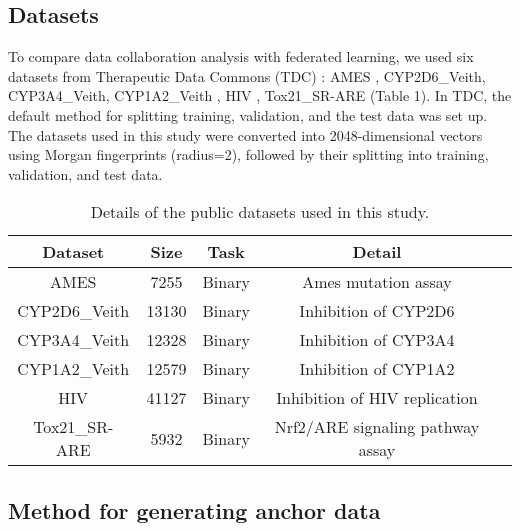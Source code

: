\documentclass{article}
\begin{document}
\subsection{Datasets}
\label{sec:sample1}
To compare data collaboration analysis with federated learning, we used six datasets from Therapeutic Data Commons (TDC) \cite{huang2021therapeutics}: AMES \cite{xu2012silico}, CYP2D6\_Veith, CYP3A4\_Veith, CYP1A2\_Veith \cite{veith2009comprehensive}, HIV \cite{wu2018moleculenet}, Tox21\_SR-ARE \cite{mayr2016deeptox} (Table 1). In TDC, the default method for splitting training, validation, and the test data was set up. The datasets used in this study were converted into 2048-dimensional vectors using Morgan fingerprints (radius=2), followed by their splitting into training, validation, and test data.

\begin{table}[htbp]
\centering
\caption{Details of the public datasets used in this study.}
  \label{tab:Table 1}
  \begin{tabular}{ccccc}
    \hline
Dataset & Size & Task & Detail \\ 
    \hline
AMES & 7255 & Binary & Ames mutation assay \\ 
CYP2D6\_Veith & 13130 & Binary & Inhibition of CYP2D6 \\
CYP3A4\_Veith & 12328 & Binary & Inhibition of CYP3A4 \\
CYP1A2\_Veith & 12579 & Binary & Inhibition of CYP1A2 \\ 
HIV & 41127 & Binary & Inhibition of HIV replication \\
Tox21\_SR-ARE & 5932 & Binary & Nrf2/ARE signaling pathway assay \\
    \hline
\end{tabular}
\end{table}

\subsection{Method for generating anchor data}
\end{document}
